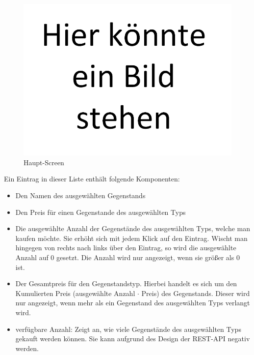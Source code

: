 \documentclass{scrartcl}
\begin{document}
	\begin{figure}[!h]
		\centering
		\includegraphics[scale=0.5]{./figures/placeholder.png}
		\caption{Haupt-Screen}
		\label{mainscreen}
	\end{figure}

	Ein Eintrag in dieser Liste enthält folgende Komponenten:

	\begin{itemize}
		\item Den Namen des ausgewählten Gegenstands

		\item Den Preis für einen Gegenstande des ausgewählten Typs

		\item Die ausgewählte Anzahl der Gegenstände des ausgewählten Typs, welche man kaufen möchte.
		Sie erhöht sich mit jedem Klick auf den Eintrag.
		Wischt man hingegen von rechts nach links über den Eintrag, so wird die ausgewählte Anzahl auf 0 gesetzt.
		Die Anzahl wird nur angezeigt, wenn sie größer als 0 ist.

		\item Der Gesamtpreis für den Gegenstandstyp.
		Hierbei handelt es sich um den Kumulierten Preis (ausgewählte Anzahl $\cdot$ Preis) des Gegenstands.
		Dieser wird nur angezeigt, wenn mehr als ein Gegenstand des ausgewählten Typs verlangt wird.

		\item verfügbare Anzahl: Zeigt an, wie viele Gegenstände des ausgewählten Typs gekauft werden können.
		Sie kann aufgrund des Design der REST-API negativ werden.
	\end{itemize}
\end{document}
